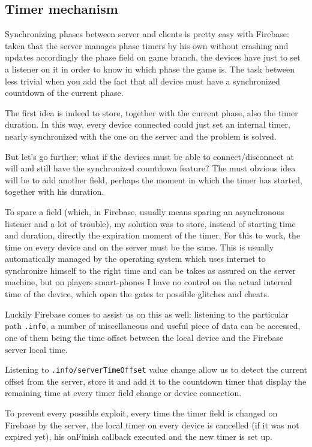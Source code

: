 		\subsection{Timer mechanism}\label{focus:timer}
		
			Synchronizing phases between server and clients is pretty easy with Firebase: taken that the server manages phase timers by his own without crashing and updates accordingly the phase field on game branch, the devices have just to set a listener on it in order to know in which phase the game is.
			The task between less trivial when you add the fact that all device must have a synchronized countdown of the current phase.
			
			The first idea is indeed to store, together with the current phase, also the timer duration.
			In this way, every device connected could just set an internal timer, nearly synchronized with the one on the server and the problem is solved.
			
			But let's go further: what if the devices must be able to connect/disconnect at will and still have the synchronized countdown feature?
			The must obvious idea will be to add another field, perhaps the moment in which the timer has started, together with his duration.
			
			To spare a field (which, in Firebase, usually means sparing an asynchronous listener and a lot of trouble), my solution was to store, instead of starting time and duration, directly the expiration moment of the timer.
			For this to work, the time on every device and on the server must be the same. This is usually automatically managed by the operating system which uses internet to synchronize himself to the right time and can be takes as assured on the server machine, but on players smart-phones I have no control on the actual internal time of the device, which open the gates to possible glitches and cheats.
			
			Luckily Firebase comes to assist us on this as well: listening to the particular path \lstinline|.info|, a number of miscellaneous and useful piece of data can be accessed, one of them being the time offset between the local device and the Firebase server local time.
			
			Listening to \lstinline|.info/serverTimeOffset| value change allow us to detect the current offset from the server, store it and add it to the countdown timer that display the remaining time at every timer field change or device connection.
			
			To prevent every possible exploit, every time the timer field is changed on Firebase by the server, the local timer on every device is cancelled (if it was not expired yet), his onFinish callback executed and the new timer is set up.
		
